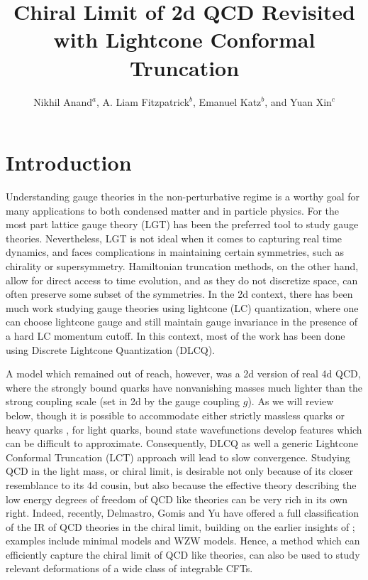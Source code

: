 \documentclass[12pt]{article}
\title{
 Chiral Limit of 2d QCD Revisited with Lightcone Conformal Truncation
}
\author{Nikhil Anand$^a$, A. Liam Fitzpatrick$^b$, Emanuel Katz$^b$, and Yuan Xin$^c$}
\affiliation[a]{Department of Physics, McGill University, Montr\'eal, QC H3A 2T8, Canada}
\affiliation[b]{Department of Physics, Boston University, Boston, MA 02215, USA}
\affiliation[c]{Department of Physics, Yale University, New Haven, CT 06520, USA}
\begin{document}
\maketitle  







\section{Introduction}
\label{sec:intro}

Understanding gauge theories in the non-perturbative regime is a worthy goal for many applications to both condensed matter and in particle physics.  For the most part lattice gauge theory (LGT) has been the preferred tool to study gauge theories.  Nevertheless, LGT is not ideal when it comes to capturing real time dynamics, and faces complications in maintaining certain symmetries, such as chirality or supersymmetry.  Hamiltonian truncation methods, on the other hand, allow for direct access to time evolution, and as they do not discretize space, can often preserve some subset of the symmetries.  In the 2d context, there has been much work studying gauge theories using lightcone (LC) quantization, where one can choose lightcone gauge and still maintain gauge invariance in the presence of a hard LC momentum cutoff.  In this context, most of the work has been done using Discrete Lightcone Quantization (DLCQ)\cite{Pauli:1985ps}.


A model which remained out of reach, however, was a 2d version of real 4d QCD, where the strongly bound quarks have nonvanishing masses much lighter than the strong coupling scale (set in 2d by the gauge coupling $g$).  As we will review below, though it is possible to accommodate either strictly massless quarks or heavy quarks \cite{Pauli:1985pv, Pauli:1985ps, Hornbostel:1988fb,Hornbostel:1988ne,Bhanot:1993xp,
Demeterfi:1993rs,Anand:2020gnn,Katz:2014uoa}, for light quarks, bound state wavefunctions develop features which can be difficult to approximate.  Consequently, DLCQ  as well a generic Lightcone Conformal Truncation (LCT) approach will lead to slow convergence.  Studying QCD in the light mass, or chiral limit, is desirable not only because of its closer resemblance to its 4d cousin, but also because the effective theory describing the low energy degrees of freedom of QCD like theories can be very rich in its own right.  Indeed, recently, Delmastro, Gomis and Yu \cite{Delmastro:2021otj} have offered a full classification of the IR of QCD theories in the chiral limit, building on the earlier insights of \cite{Kutasov:1993gq, Kutasov:1994xq,Bhanot:1993xp}; examples  include minimal models and WZW models.  Hence, a method which can efficiently capture the chiral limit of QCD like theories, can also be used to study relevant deformations of a wide class of integrable CFTs.
\end{document}
